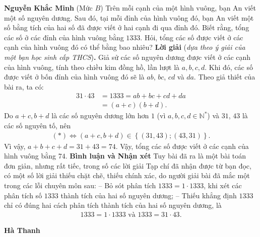 \begin{multicols}{2}
	\vskip 0.05cm
	\hfill	\textbf{\color{thachthuctoanhoc}Nguyễn Khắc Minh}
	\vskip 0.05cm
	{}
	(Mức $B$)
	Trên mỗi cạnh của một hình vuông, bạn An viết một số nguyên dương. Sau đó, tại mỗi đỉnh của hình vuông đó, bạn An viết một số bằng tích của hai số đã được viết ở hai cạnh đi qua đỉnh đó. Biết rằng, tổng các số ở các đỉnh của hình vuông bằng $1333$. Hỏi, tổng các số được viết ở các cạnh của hình vuông đó có thể bằng bao nhiêu?
	\vskip 0.05cm
	\textbf{\color{thachthuctoanhoc}Lời giải} (\textit{dựa theo ý giải của một bạn học sinh cấp THCS})\textbf{\color{thachthuctoanhoc}.}
	\vskip 0.05cm
	Giả sử các số nguyên dương được viết ở các cạnh của hình vuông, tính theo chiều kim đồng hồ, lần lượt là $a, b, c, d$.
	\vskip 0.05cm
	Khi đó, các số được viết ở bốn đỉnh của hình vuông đó sẽ là $ab$, $bc$, $cd$ và $da$.
	\vskip 0.05cm
	Theo giả thiết của bài ra, ta có:
	\begin{align*}
		31 \cdot 43 &= 1333 = ab + bc + cd + da \\
		&= \left( a + c \right)\left( b + d \right) . \tag{$*$}
	\end{align*}
	Do $a + c, b + d$ là các số nguyên dương lớn hơn $1$ (vì $a,b,c,d \in \mathbb{N^*}$) và $31$, $43$ là các số nguyên tố, nên
	\begin{align*}
		\left( *  \right) \Leftrightarrow \left( {a + c,b + d} \right) \in \left\{ {\left( {31,43} \right);\left( {43,31} \right)} \right\}.
	\end{align*}
	Vì vậy, $a + b + c + d = 31 + 43 = 74$.
	\vskip 0.05cm
	Vậy, tổng các số được viết ở các cạnh của hình vuông bằng $74$.
	\vskip 0.05cm
	\textbf{\color{thachthuctoanhoc}Bình luận và Nhận xét}
	\vskip 0.05cm	
	Tuy bài đã ra là một bài toán đơn giản, nhưng rất tiếc, trong số các lời giải Tạp chí đã nhận được từ bạn đọc, có một số lời giải thiếu chặt chẽ, thiếu chính xác, do người giải bài đã mắc một trong các lỗi chuyên môn sau:
	\vskip 0.05cm
	-- Bỏ sót phân tích $1333 = 1 \cdot 1333$, khi xét các phân tích số $1333$ thành tích của hai số nguyên dương;
	\vskip 0.05cm
	-- Thiếu khẳng định $1333$ chỉ có đúng hai cách phân tích thành tích của hai số nguyên dương, là
	\begin{align*}
		1333 = 1 \cdot 1333 \text{ và } 1333 = 31 \cdot 43.
	\end{align*}  
	\begin{flushright}
		\textbf{\color{thachthuctoanhoc}Hà Thanh}
	\end{flushright}
	{}

\end{multicols}
